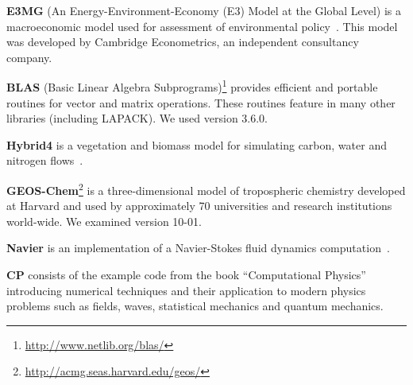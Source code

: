 \documentclass[9pt]{sigplanconf}
\theoremstyle{definition}
\begin{document}
\textbf{E3MG} (An Energy-Environment-Economy (E3) Model at the Global Level) is a macroeconomic model used for assessment of environmental policy~\cite{RePEc:aen:journl:2006se-a12}. This model was developed by Cambridge Econometrics, an independent consultancy company.

\textbf{BLAS} (Basic Linear Algebra Subprograms)\footnote{\url{http://www.netlib.org/blas/}} provides efficient and portable routines for vector and matrix operations. These routines feature in many other libraries (including LAPACK). We used version 3.6.0.

\textbf{Hybrid4} is a vegetation and biomass model for simulating carbon, water and nitrogen flows~\cite{GBC:GBC635}.

\textbf{GEOS-Chem}\footnote{\url{http://acmg.seas.harvard.edu/geos/}} is a three-dimensional model of tropospheric chemistry developed at Harvard and used by approximately 70 universities and research institutions world-wide. We examined version 10-01.

\textbf{Navier} is an implementation of a Navier-Stokes fluid dynamics computation~\cite{griebel1997numerical}.

\textbf{CP} consists of the example code from the book ``Computational Physics''~\cite{nicholas2006computational} introducing numerical techniques and their application to modern physics problems such as fields, waves, statistical mechanics and quantum mechanics.






\end{document}
